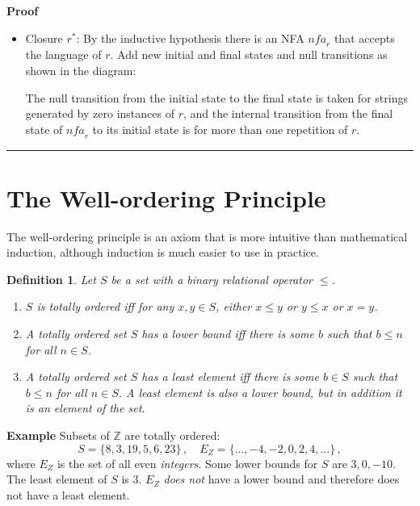 \documentclass[12pt,a4paper]{article}
\newtheorem{definition}[theorem]{Definition}
\newcommand*{\qed}{\hfill\rule[-2pt]{4pt}{10pt}}
\newenvironment{example}{\textbf{Example}}{}
\newenvironment{proof}{\textbf{Proof}}{\qed}
\begin{document}
\begin{proof}
\begin{itemize}
\item Closure $r^*$: By the inductive hypothesis there is an NFA $\mathit{nfa}_r$ that accepts the language of $r$. Add new initial and final states and null transitions as shown in the diagram:
\begin{center}
\end{center}
The null transition from the initial state to the final state is taken for strings generated by zero instances of $r$, and the internal transition from the final state of $\mathit{nfa}_r$ to its initial state is for more than one repetition of $r$.
\end{itemize}
\end{proof}

\section{The Well-ordering Principle}\label{s.well}

The well-ordering principle is an axiom that is more intuitive than mathematical induction, although induction is much easier to use in practice.

\begin{definition} Let $S$ be a set with a binary relational operator $\leq$.
\begin{enumerate}
\item $S$ is \emph{totally ordered} iff for any $x,y\in S$, either $x\leq y$ or $y \leq x$ or $x=y$.
\item A totally ordered set $S$ has a \emph{lower bound} iff there is some $b$ such that $b\leq n$ for all $n\in S$.
\item A totally ordered set $S$ has a \emph{least element} iff there is some $b\in S$ such that $b\leq n$ for all $n\in S$. A least element is also a lower bound, but in addition it is an element of the set.
\end{enumerate}
\end{definition}
\begin{example}
Subsets of $\mathbb{Z}$ are totally ordered:
\[
S=\{8,3,19,5,6,23\}\,,\quad E_Z=\{\ldots,-4,-2,0,2,4,\ldots\}\,,
\]
where $E_Z$ is the set of all even \emph{integers}. Some lower bounds for $S$ are $3, 0, -10$. The least element of $S$ is $3$. $E_Z$ \emph{does not} have a lower bound and therefore does not have a least element.
\end{example}
\end{document}
